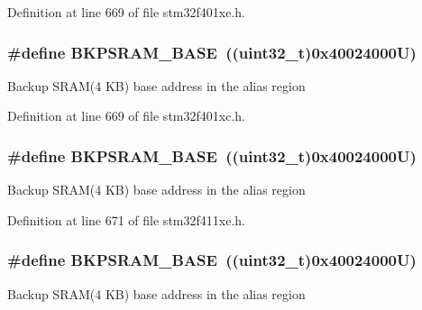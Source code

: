 Definition at line 669 of file stm32f401xe.\+h.

\subsubsection[{\texorpdfstring{B\+K\+P\+S\+R\+A\+M\+\_\+\+B\+A\+SE}{BKPSRAM_BASE}}]{\setlength{\rightskip}{0pt plus 5cm}\#define B\+K\+P\+S\+R\+A\+M\+\_\+\+B\+A\+SE~((uint32\+\_\+t)0x40024000\+U)}\hypertarget{group___peripheral__registers__structures_ga52e57051bdf8909222b36e5408a48f32}{}\label{group___peripheral__registers__structures_ga52e57051bdf8909222b36e5408a48f32}
Backup S\+R\+A\+M(4 K\+B) base address in the alias region 

Definition at line 669 of file stm32f401xc.\+h.

\subsubsection[{\texorpdfstring{B\+K\+P\+S\+R\+A\+M\+\_\+\+B\+A\+SE}{BKPSRAM_BASE}}]{\setlength{\rightskip}{0pt plus 5cm}\#define B\+K\+P\+S\+R\+A\+M\+\_\+\+B\+A\+SE~((uint32\+\_\+t)0x40024000\+U)}\hypertarget{group___peripheral__registers__structures_ga52e57051bdf8909222b36e5408a48f32}{}\label{group___peripheral__registers__structures_ga52e57051bdf8909222b36e5408a48f32}
Backup S\+R\+A\+M(4 K\+B) base address in the alias region 

Definition at line 671 of file stm32f411xe.\+h.

\subsubsection[{\texorpdfstring{B\+K\+P\+S\+R\+A\+M\+\_\+\+B\+A\+SE}{BKPSRAM_BASE}}]{\setlength{\rightskip}{0pt plus 5cm}\#define B\+K\+P\+S\+R\+A\+M\+\_\+\+B\+A\+SE~((uint32\+\_\+t)0x40024000\+U)}\hypertarget{group___peripheral__registers__structures_ga52e57051bdf8909222b36e5408a48f32}{}\label{group___peripheral__registers__structures_ga52e57051bdf8909222b36e5408a48f32}
Backup S\+R\+A\+M(4 K\+B) base address in the alias region 

